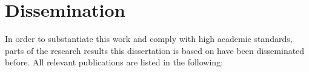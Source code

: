 \chapter*{Dissemination}
\label{chp:dissemination}
\vspace*{-10mm}

In order to substantiate this work and comply with high academic standards, parts of the research results this dissertation is based on have been disseminated before.
All relevant publications are listed in the following:


\printbibliography[sorting=ynt,filter=meFirstAuthor,heading=none]
\printbibliography[sorting=ynt,filter=meAuthor,heading=none]





\cleardoublepage